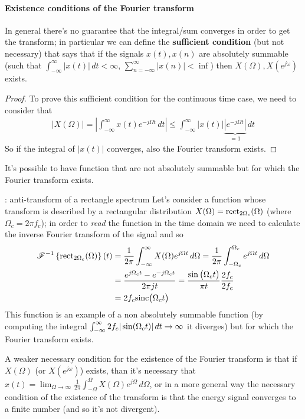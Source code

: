 	\paragraph{Existence conditions of the Fourier transform} In general there's no guarantee that the integral/sum converges in order to get the transform; in particular we can define the \textbf{sufficient condition} (but not necessary) that says that if the signals $x(t), x(n)$ are absolutely summable (such that $\int_{-\infty}^\infty |x(t)|\, dt < \infty$, $\sum_{n=-\infty}^\infty |x(n)| < \inf $) then $X(\Omega), X(e^{j\omega})$ exists.
	\begin{proof}
		To prove this sufficient condition for the continuous time case, we need to consider that
		\begin{align*}
			|X(\Omega)| = \left| \int_{-\infty}^\infty x(t) e^{-j\Omega t}\, dt \right| \leq \int_{-\infty}^\infty |x(t)|\underbrace{ \left|e^{-j\Omega t}\right|}_{=1} \, dt
		\end{align*}
		So if the integral of $|x(t)|$ converges, also the Fourier transform exists.
	\end{proof}
	
	It's possible to have function that are not absolutely summable but for which the Fourier transform exists.
	
	\begin{example}{: anti-transform of a rectangle spectrum}
		Let's consider a function whose transform is described by a rectangular distribution $X(\Omega) = \textrm{rect}_{2\Omega_c}(\Omega)$ (where $\Omega_c = 2\pi f_c$); in order to \textit{read} the function in the time domain we need to calculate the inverse Fourier transform of the signal and so
		\begin{align*}
			\mathscr{F}^{-1}\left\{ \textrm{rect}_{2\Omega_c}(\Omega) \right\}(t) & = \frac 1{2\pi} \int_{-\infty}^\infty X(\Omega) e^{j\Omega t} \, d\Omega = \frac 1 {2\pi} \int_{-\Omega_c}^{\Omega_c} e^{j\Omega t}\, d\Omega \\
			& = \frac{e^{j\Omega_c t} - e^{-j\Omega_c t}}{2\pi j t} = \frac{\sin\big(\Omega_c t\big)}{\pi t} \frac{2f_c}{2f_c} \\ 
			& = 2 f_c \textrm{sinc}\big(\Omega_c t\big)
		\end{align*}
		This function is an example of a non absolutely summable function (by computing the integral $\int_{-\infty}^\infty 2f_c|\sin(\Omega_c t)| \, dt \rightarrow \infty$ it diverges) but for which the Fourier transform exists.
	\end{example}

	
	A weaker necessary condition for the existence of the Fourier transform is that if $X(\Omega)$ (or $X(e^{j\omega})$) exists, than it's necessary that $x(t) = \lim_{\Omega \rightarrow \infty} \frac 1 {2\pi} \int_{-\Omega}^\Omega X(\Omega) e^{j\Omega} \, d\Omega $, or in a more general way the necessary condition of the existence of the transform is that the energy signal converges to a finite number (and so it's not divergent).
	
